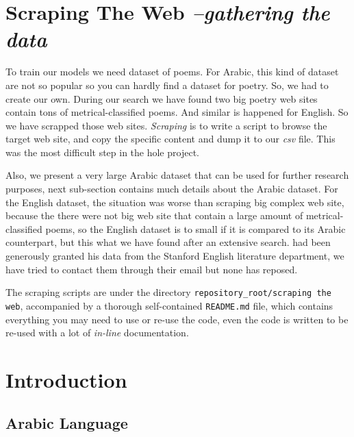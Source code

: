 \documentclass[12pt]{report}
\begin{document}
\section*{Scraping The Web \textit{\small --gathering the data}}
To train our models we need dataset of poems. For Arabic, this kind of dataset
are not so popular so you can hardly find a dataset for poetry. So, we had to
create our own. During our search we have found two big poetry web sites
contain tons of metrical-classified poems. And similar is happened for English.
So we have scrapped those web sites. \textit{Scraping} is to write a script to
browse the target web site, and copy the specific content and dump it to our
\textit{csv} file. This was the most difficult step in the hole project. 
 
Also, we present a very large Arabic dataset that can be used for further
research purposes, next sub-section contains much details about the Arabic
dataset. For the English dataset, the situation was worse than scraping big
complex web site, because the there were not big web site that contain a large
amount of metrical-classified poems, so the English dataset is to small if it is
compared to its Arabic counterpart, but this what we have found after an
extensive search. 
\citet{farren} had been generously granted his data from the
Stanford English literature department, we have tried to contact them through
their email but none has reposed.

The scraping scripts are under the directory \texttt{repository\_root/scraping
the web}, accompanied by  a thorough self-contained \texttt{README.md} file,
which contains everything you may need to use or re-use the code, even the code
is written to be re-used with a lot of  \textit{in-line} documentation.























\section*{Introduction}
\subsection*{Arabic Language}
\end{document}
